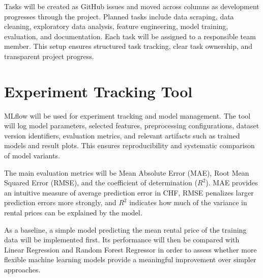 \documentclass[11pt,a4paper]{article}
\begin{document}
Tasks will be created as GitHub issues and moved across columns as development progresses through the project. Planned tasks include data scraping, data cleaning, exploratory data analysis, feature engineering, model training, evaluation, and documentation. Each task will be assigned to a responsible team member. This setup ensures structured task tracking, clear task ownership, and transparent project progress.


\section{Experiment Tracking Tool}

MLflow will be used for experiment tracking and model management. The tool will log model parameters, selected features, preprocessing configurations, dataset version identifiers, evaluation metrics, and relevant artifacts such as trained models and result plots. This ensures reproducibility and systematic comparison of model variants.

The main evaluation metrics will be Mean Absolute Error (MAE), Root Mean Squared Error (RMSE), and the coefficient of determination ($R^2$). MAE provides an intuitive measure of average prediction error in CHF, RMSE penalizes larger prediction errors more strongly, and $R^2$ indicates how much of the variance in rental prices can be explained by the model.

As a baseline, a simple model predicting the mean rental price of the training data will be implemented first. Its performance will then be compared with Linear Regression and Random Forest Regressor in order to assess whether more flexible machine learning models provide a meaningful improvement over simpler approaches.
\end{document}
